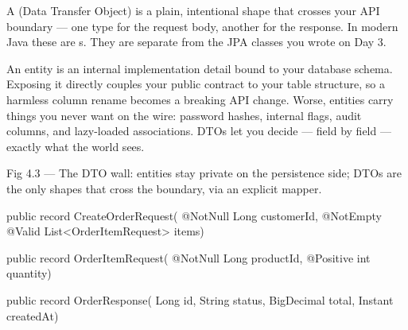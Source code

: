 
 A  (Data Transfer Object) is a plain, intentional shape that crosses your API boundary --- one type for the request body, another for the response. In modern Java these are s. They are separate from the JPA  classes you wrote on Day 3.

 An entity is an internal implementation detail bound to your database schema. Exposing it directly couples your public contract to your table structure, so a harmless column rename becomes a breaking API change. Worse, entities carry things you never want on the wire: password hashes, internal flags, audit columns, and lazy-loaded associations. DTOs let you decide --- field by field --- exactly what the world sees.

\begin{wbfigure}{Fig 4.3 --- The DTO wall: entities stay private on the persistence side; DTOs are the only shapes that cross the boundary, via an explicit mapper.}
\end{wbfigure}

\begin{javabox}
public record CreateOrderRequest(
    @NotNull Long customerId,
    @NotEmpty @Valid List<OrderItemRequest> items) {}

public record OrderItemRequest(
    @NotNull Long productId,
    @Positive int quantity) {}

public record OrderResponse(
    Long id, String status, BigDecimal total, Instant createdAt) {}
\end{javabox}

